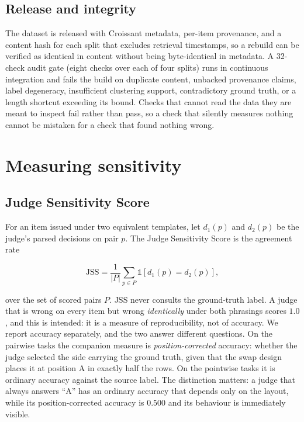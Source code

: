 \documentclass[11pt]{article}          %
\begin{document}
\subsection{Release and integrity}

The dataset is released with Croissant metadata, per-item provenance, and a
content hash for each split that excludes retrieval timestamps, so a rebuild can
be verified as identical in content without being byte-identical in metadata. A
32-check audit gate (eight checks over each of four splits) runs in continuous integration and fails the build on
duplicate content, unbacked provenance claims, label degeneracy, insufficient
clustering support, contradictory ground truth, or a length shortcut exceeding
its bound. Checks that cannot read the data they are meant to inspect fail
rather than pass, so a check that silently measures nothing cannot be mistaken
for a check that found nothing wrong.
\section{Measuring sensitivity}
\label{sec:metrics}

\subsection{Judge Sensitivity Score}

For an item issued under two equivalent templates, let $d_1(p)$ and $d_2(p)$ be
the judge's parsed decisions on pair $p$. The Judge Sensitivity Score is the
agreement rate

\[
  \mathrm{JSS} = \frac{1}{|P|}\sum_{p \in P} \mathbb{1}[d_1(p) = d_2(p)],
\]

over the set of scored pairs $P$. JSS never consults the ground-truth label. A
judge that is wrong on every item but wrong \emph{identically} under both
phrasings scores $1.0$, and this is intended: it is a measure of reproducibility,
not of accuracy. We report accuracy separately, and the two answer different
questions. On the pairwise tasks the companion measure is \emph{position-corrected}
accuracy: whether the judge selected the side carrying the ground truth, given
that the swap design places it at position A in exactly half the rows. On the
pointwise tasks it is ordinary accuracy against the source label. The
distinction matters: a judge that always answers ``A'' has an ordinary accuracy
that depends only on the layout, while its position-corrected accuracy is
$0.500$ and its behaviour is immediately visible.
\end{document}
